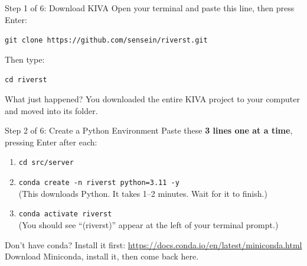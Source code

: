 \documentclass[aspectratio=169]{beamer}
\begin{document}
\begin{frame}{Step 1 of 6: Download KIVA}
Open your terminal and paste this line, then press Enter:

\vspace{0.3cm}

\begin{center}
\large \texttt{git clone https://github.com/sensein/riverst.git}
\end{center}

\vspace{0.3cm}

Then type:

\vspace{0.1cm}

\begin{center}
\large \texttt{cd riverst}
\end{center}

\vspace{0.5cm}

\begin{block}{What just happened?}
You downloaded the entire KIVA project to your computer and moved into its folder.
\end{block}
\end{frame}

\begin{frame}{Step 2 of 6: Create a Python Environment}
Paste these \textbf{3 lines one at a time}, pressing Enter after each:

\vspace{0.3cm}

\begin{enumerate}
    \setlength\itemsep{0.4cm}
    \item \texttt{cd src/server}
    \item \texttt{conda create -n riverst python=3.11 -y}\\
          {\small\textcolor{kivagray}{(This downloads Python. It takes 1--2 minutes. Wait for it to finish.)}}
    \item \texttt{conda activate riverst}\\
          {\small\textcolor{kivagray}{(You should see ``(riverst)'' appear at the left of your terminal prompt.)}}
\end{enumerate}

\vspace{0.3cm}

\begin{alertblock}{Don't have conda?}
Install it first: \url{https://docs.conda.io/en/latest/miniconda.html}\\
Download Miniconda, install it, then come back here.
\end{alertblock}
\end{frame}
\end{document}
